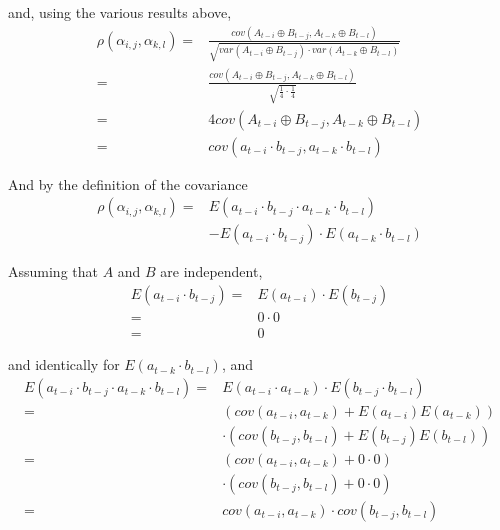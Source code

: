 \documentclass{article}
\newcommand{\xor}{\oplus}
\newcommand{\corr}[2]{\rho\left( #1 , #2 \right)}
\newcommand{\cov}[2]{\textit{cov}\left( #1 , #2 \right)}
\newcommand{\var}[1]{\textit{var}\left( #1 \right)}
\newcommand{\Exp}[1]{\textit{E}\left( #1 \right)}
\newcommand{\A}[1]{A_{t-#1}}
\renewcommand{\a}[1]{a_{t-#1}}
\newcommand{\B}[1]{B_{t-#1}}
\renewcommand{\b}[1]{b_{t-#1}}
\begin{document}
and, using the various results above,
\begin{align}
  \corr{\alpha_{i,j}}{\alpha_{k,l}} = & \frac{\cov{\A{i} \xor \B{j}}{\A{k} \xor \B{l}}}{\sqrt{\var{\A{i} \xor \B{j}} \cdot \var{\A{k} \xor \B{l}}}} \\
                                    = & \frac{\cov{\A{i} \xor \B{j}}{\A{k} \xor \B{l}}}{\sqrt{\frac{1}{4} \cdot \frac{1}{4}}} \\
                                    = & 4 \cov{\A{i} \xor \B{j}}{\A{k} \xor \B{l}} \\
                                    = & \cov{\a{i} \cdot \b{j}}{\a{k} \cdot \b{l}}
\end{align}

And by the definition of the covariance
\begin{align}
  \corr{\alpha_{i,j}}{\alpha_{k,l}} = & \Exp{\a{i} \cdot \b{j} \cdot \a{k} \cdot \b{l}} \nonumber \\
                                      & - \Exp{\a{i} \cdot \b{j}} \cdot \Exp{\a{k} \cdot \b{l}}
\end{align}

Assuming that $A$ and $B$ are independent, 
\begin{align}
  \Exp{\a{i} \cdot \b{j}} = & \Exp{\a{i}} \cdot \Exp{\b{j}} \\
                          = & 0 \cdot 0 \\
                          = & 0
\end{align}

and identically for $\Exp{\a{k} \cdot \b{l}}$, and
\begin{align}
  \Exp{\a{i} \cdot \b{j} \cdot \a{k} \cdot \b{l}} = & \Exp{\a{i} \cdot \a{k}} \cdot \Exp{\b{j} \cdot \b{l}} \\
                                                  = &       \left( \cov{\a{i}}{\a{k}} + \Exp{\a{i}}\Exp{\a{k}} \right) \nonumber \\
                                                    & \cdot \left( \cov{\b{j}}{\b{l}} + \Exp{\b{j}}\Exp{\b{l}} \right) \\
                                                  = &       \left( \cov{\a{i}}{\a{k}} + 0 \cdot 0 \right) \nonumber \\
                                                    & \cdot \left( \cov{\b{j}}{\b{l}} + 0 \cdot 0 \right) \\
                                                  = & \cov{\a{i}}{\a{k}} \cdot \cov{\b{j}}{\b{l}}
\end{align}
\end{document}
